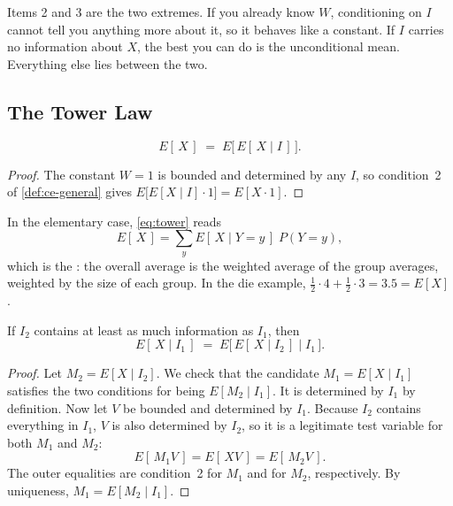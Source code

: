 Items 2 and 3 are the two extremes.
If you already know $W$, conditioning on $I$ cannot tell you anything more about it, so it behaves like a constant.
If $I$ carries no information about $X$, the best you can do is the unconditional mean.
Everything else lies between the two.
\suppend

\subsection{The Tower Law}

\begin{theorem}
	\begin{equation}
		E[\,X\,] \;=\; E\bigl[\,E[\,X\mid I\,]\,\bigr] . \label{eq:tower}
	\end{equation}
\end{theorem}

\suppstart
\begin{proof}
	The constant $W=1$ is bounded and determined by any $I$, so condition~2 of \autoref{def:ce-general} gives
	$E\bigl[E[X\mid I]\cdot1\bigr]=E[X\cdot1]$.
\end{proof}

In the elementary case, \eqref{eq:tower} reads
\[
	E[\,X\,] = \sum_{y} E[\,X\mid Y=y\,]\;P(Y=y) ,
\]
which is the : the overall average is the weighted average of the group averages, weighted by the size of each group.
In the die example, $\tfrac12\cdot4+\tfrac12\cdot3=3.5=E[X]$.
\suppend


\begin{theorem}
	If $I_{2}$ contains at least as much information as $I_{1}$, then
	\begin{equation}
		E[\,X\mid I_{1}\,] \;=\; E\bigl[\,E[\,X\mid I_{2}\,]\mid I_{1}\,\bigr] . \label{eq:tower-nested}
	\end{equation}
\end{theorem}

\suppstart
\begin{proof}
	Let $M_{2}=E[X\mid I_{2}]$.
	We check that the candidate $M_{1}=E[X\mid I_{1}]$ satisfies the two conditions for being $E[M_{2}\mid I_{1}]$.
	It is determined by $I_{1}$ by definition.
	Now let $V$ be bounded and determined by $I_{1}$.
	Because $I_{2}$ contains everything in $I_{1}$, $V$ is also determined by $I_{2}$, so it is a legitimate test variable for both $M_{1}$ and $M_{2}$:
	\[
		E[\,M_{1}V\,] = E[\,XV\,] = E[\,M_{2}V\,] .
	\]
	The outer equalities are condition~2 for $M_{1}$ and for $M_{2}$, respectively.
	By uniqueness, $M_{1}=E[M_{2}\mid I_{1}]$.
\end{proof}

